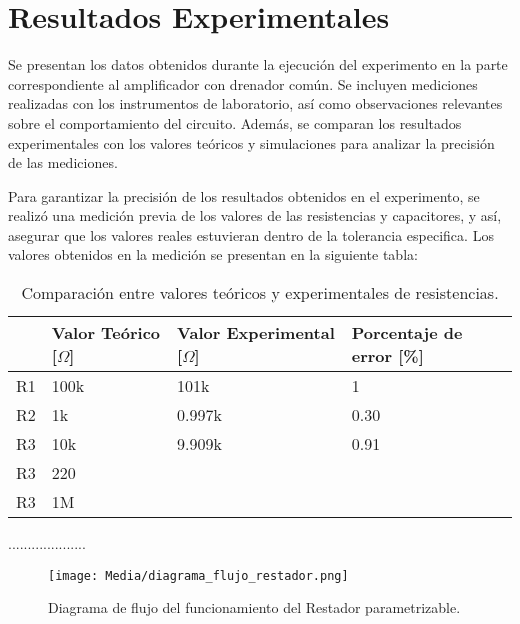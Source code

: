 \documentclass[journal]{IEEEtran}
\begin{document}
\section{Resultados Experimentales}
\par Se presentan los datos obtenidos durante la ejecución del experimento en la parte correspondiente al amplificador con drenador común. Se incluyen mediciones realizadas con los instrumentos de laboratorio, así como observaciones relevantes sobre el comportamiento del circuito. Además, se comparan los resultados experimentales con los valores teóricos y simulaciones para analizar la precisión de las mediciones.
\par Para garantizar la precisión de los resultados obtenidos en el experimento, se realizó una medición previa de los valores de las resistencias y capacitores, y así, asegurar que los valores reales estuvieran dentro de la tolerancia especifica. Los valores obtenidos en la medición se presentan en la siguiente tabla:

\begin{table}[h]
    \caption{Comparación entre valores teóricos y experimentales de resistencias.}
    \centering
    \renewcommand{\arraystretch}{1.2} %
    \begin{tabular}{|l|p{2cm}|p{2cm}|p{2cm}|}
        \hline
        & \textbf{Valor Teórico [$\Omega$]} & \textbf{Valor Experimental [$\Omega$]} & \textbf{Porcentaje de error [\%]} \\
        \hline
        R1 & 100k  & 101k  & 1 \\
        \hline
        R2 & 1k   & 0.997k  & 0.30 \\
        \hline
        R3 & 10k & 9.909k & 0.91 \\
        \hline
        R3 & 220 &  &  \\
        \hline
        R3 & 1M &  &  \\
        \hline
    \end{tabular}
    \label{tab:resistencias}
\end{table}

\par ....................

\begin{figure}[H]
    \centering
    \texttt{[image: Media/diagrama\_flujo\_restador.png]}
    \caption{Diagrama de flujo del funcionamiento del Restador parametrizable.}
    \label{fig:diagrama_flujo_restador}
\end{figure}
\end{document}
